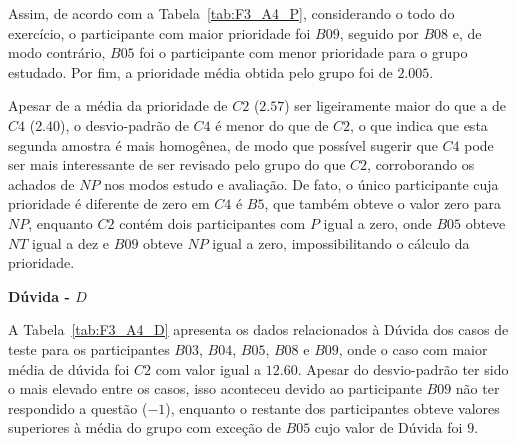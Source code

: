 Assim, de acordo com a Tabela~\ref{tab:F3_A4_P}, considerando o todo do exercício, o participante com maior prioridade foi $B09$, seguido por $B08$ e, de modo contrário, $B05$ foi o participante com menor prioridade para o grupo estudado. Por fim, a prioridade média obtida pelo grupo foi de $2.005$.

Apesar de a média da prioridade de $C2$ ($2.57$) ser ligeiramente maior do que a de $C4$ ($2.40$), o desvio-padrão de $C4$ é menor do que de $C2$, o que indica que esta segunda amostra é mais homogênea, de modo que possível sugerir que $C4$ pode ser mais interessante de ser revisado pelo grupo do que $C2$, corroborando os achados de $NP$ nos modos estudo e avaliação. De fato, o único participante cuja prioridade é diferente de zero em $C4$ é $B5$, que também obteve o valor zero para $NP$, enquanto $C2$ contém dois participantes com $P$ igual a zero, onde $B05$ obteve $NT$ igual a dez e $B09$ obteve $NP$ igual a zero, impossibilitando o cálculo da prioridade.

\textbf{Dúvida - $D$}

A Tabela~\ref{tab:F3_A4_D} apresenta os dados relacionados à Dúvida dos casos de teste para os participantes $B03$, $B04$, $B05$, $B08$ e $B09$, onde o caso com maior média de dúvida foi $C2$ com valor igual a $12.60$. Apesar do desvio-padrão ter sido o mais elevado entre os casos, isso aconteceu devido ao participante $B09$ não ter respondido a questão ($-1$), enquanto o restante dos participantes obteve valores superiores à média do grupo com exceção de $B05$ cujo valor de Dúvida foi $9$.

